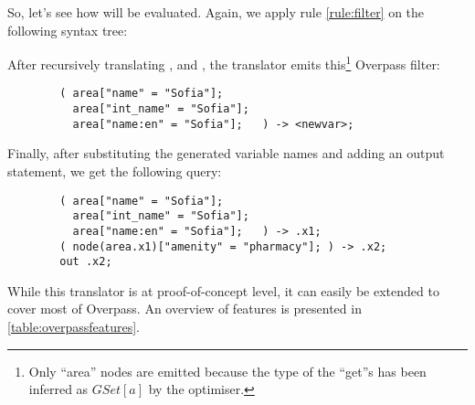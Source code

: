 \documentclass[main.tex]{subfiles}
\begin{document}
\begin{example}
    So, let's see how  will be evaluated. Again, we apply
    rule \ref{rule:filter} on the following syntax tree:
    
    After recursively translating , 
    and , the translator emits this\footnote{
        Only ``area'' nodes are emitted because the type of the ``get''s has
        been inferred as $GSet[a]$ by the optimiser.
    } Overpass filter:
        
    \begin{lstlisting}
        ( area["name" = "Sofia"]; 
          area["int_name" = "Sofia"]; 
          area["name:en" = "Sofia"];   ) -> <newvar>;
    \end{lstlisting}
    
    Finally, after substituting the generated variable names and adding
    an output statement, we get the following query:
    
    \begin{lstlisting}
        ( area["name" = "Sofia"]; 
          area["int_name" = "Sofia"]; 
          area["name:en" = "Sofia"];   ) -> .x1;
        ( node(area.x1)["amenity" = "pharmacy"]; ) -> .x2;
        out .x2;
    \end{lstlisting}
\end{example}

While this translator is at proof-of-concept level, it can easily be extended
to cover most of Overpass. An overview of features is presented in
\cref{table:overpassfeatures}.
\end{document}
